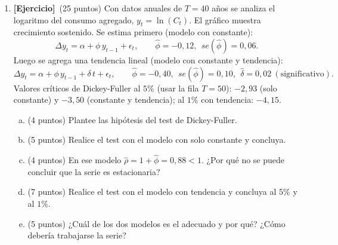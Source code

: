 \documentclass[12pt,letterpaper]{article}
\newcommand{\ejer}{\textbf{[Ejercicio]}}
\begin{document}
\begin{enumerate}[1.]
\item \ejer\ (25 puntos) Con datos anuales de $T=40$ años se analiza el logaritmo del consumo agregado, $y_t=\ln(C_t)$. El gráfico muestra crecimiento sostenido. Se estima primero (modelo con constante):
\[
\Delta y_t=\alpha+\phi\,y_{t-1}+\epsilon_t,\qquad \hat\phi=-0{,}12,\ \ se(\hat\phi)=0{,}06 .
\]
Luego se agrega una tendencia lineal (modelo con constante y tendencia):
\[
\Delta y_t=\alpha+\phi\,y_{t-1}+\delta\,t+\epsilon_t,\qquad \hat\phi=-0{,}40,\ \ se(\hat\phi)=0{,}10,\ \ \hat\delta=0{,}02\ (\text{significativo}).
\]
Valores críticos de Dickey-Fuller al $5\%$ (usar la fila $T=50$): $-2{,}93$ (solo constante) y $-3{,}50$ (constante y tendencia); al $1\%$ con tendencia: $-4{,}15$.
\begin{enumerate}[a)]
\item (4 puntos) Plantee las hipótesis del test de Dickey-Fuller.
\item (5 puntos) Realice el test con el modelo con solo constante y concluya.
\item (4 puntos) En ese modelo $\hat\rho=1+\hat\phi=0{,}88<1$. ¿Por qué no se puede concluir que la serie es estacionaria?
\item (7 puntos) Realice el test con el modelo con tendencia y concluya al $5\%$ y al $1\%$.
\item (5 puntos) ¿Cuál de los dos modelos es el adecuado y por qué? ¿Cómo debería trabajarse la serie?
\end{enumerate}


\end{enumerate}
\end{document}
